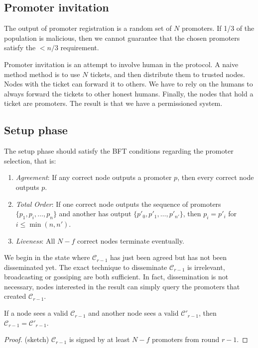 \subsection{Promoter invitation}
The output of promoter registration is a random set of $N$ promoters. If 1/3 of
the population is malicious, then we cannot guarantee that the chosen promoters
satisfy the $< n/3$ requirement.

Promoter invitation is an attempt to involve human in the protocol. A naive
method method is to use $N$ tickets, and then distribute them to trusted nodes.
Nodes with the ticket can forward it to others. We have to rely on the humans to
always forward the tickets to other honest humans. Finally, the nodes that hold
a ticket are promoters. The result is that we have a permissioned system.

\subsection{Setup phase}
The setup phase should satisfy the BFT conditions regarding the promoter
selection, that is:
\begin{enumerate}
\item \emph{Agreement}: If any correct node outputs a promoter $p$, then every
  correct node outputs $p$.
\item \emph{Total Order}: If one correct node outputs the sequence of promoters
  $\{p_1, p_i, \dots, p_n\}$ and another has output $\{p'_0, p'_1, \dots,
  p'_{n'} \}$, then $p_i = p'_i$ for $i \le \min(n, n')$.
\item \emph{Liveness}: All $N - f$ correct nodes terminate eventually.
\end{enumerate}

We begin in the state where $\mathcal{C}_{r-1}$ has just been agreed but has not
been disseminated yet. The exact technique to disseminate $\mathcal{C}_{r-1}$ is
irrelevant, broadcasting or gossiping are both sufficient. In fact,
dissemination is not necessary, nodes interested in the result can simply query
the promoters that created $\mathcal{C}_{r-1}$.

\begin{lemma}
  If a node sees a valid $\mathcal{C}_{r-1}$ and another node sees a valid
  $\mathcal{C}'_{r-1}$, then $\mathcal{C}_{r-1} = \mathcal{C}'_{r-1}$.
\end{lemma}
\begin{proof}
  (sketch) $\mathcal{C}_{r-1}$ is signed by at least $N-f$ promoters from round
  $r-1$.
\end{proof}

